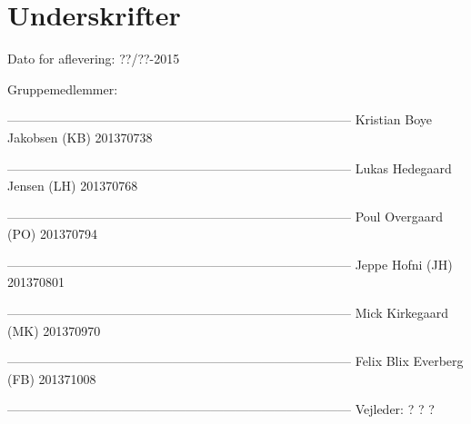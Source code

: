 \chapter*{Underskrifter}

Dato for aflevering: ??/??-2015

Gruppemedlemmer:\newline


--------------------------------------------------------------------------------- \newline
Kristian Boye Jakobsen (KB) 201370738\newline


--------------------------------------------------------------------------------- \newline
Lukas Hedegaard Jensen (LH) 201370768\newline


--------------------------------------------------------------------------------- \newline
Poul Overgaard (PO) 201370794\newline


--------------------------------------------------------------------------------- \newline
Jeppe Hofni (JH) 201370801\newline


--------------------------------------------------------------------------------- \newline
Mick Kirkegaard (MK) 201370970\newline


--------------------------------------------------------------------------------- \newline
Felix Blix Everberg (FB) 201371008\newline













--------------------------------------------------------------------------------- \newline
Vejleder: ? ? ?\newline

\afterpage{\null\newpage}
